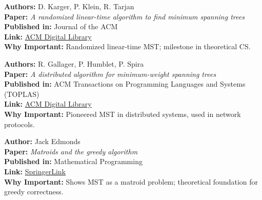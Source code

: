 \documentclass[a4paper,14pt]{extarticle}
\begin{document}
\begin{tcolorbox}[title=5. Karger’s Randomized MST (1995)]
\textbf{Authors:} D. Karger, P. Klein, R. Tarjan \\
\textbf{Paper:} \textit{A randomized linear-time algorithm to find minimum spanning trees} \\
\textbf{Published in:} Journal of the ACM \\
\textbf{Link:} \href{https://dl.acm.org/doi/10.1145/210332.210337}{ACM Digital Library} \\
\textbf{Why Important:} Randomized linear-time MST; milestone in theoretical CS.
\end{tcolorbox}

\begin{tcolorbox}[title=6. Distributed MST (1983)]
\textbf{Authors:} R. Gallager, P. Humblet, P. Spira \\
\textbf{Paper:} \textit{A distributed algorithm for minimum-weight spanning trees} \\
\textbf{Published in:} ACM Transactions on Programming Languages and Systems (TOPLAS) \\
\textbf{Link:} \href{https://dl.acm.org/doi/10.1145/357172.357176}{ACM Digital Library} \\
\textbf{Why Important:} Pioneered MST in distributed systems, used in network protocols.
\end{tcolorbox}

\begin{tcolorbox}[title=7. Matroid Theory and Greedy MST (1971)]
\textbf{Author:} Jack Edmonds \\
\textbf{Paper:} \textit{Matroids and the greedy algorithm} \\
\textbf{Published in:} Mathematical Programming \\
\textbf{Link:} \href{https://doi.org/10.1007/BF01585995}{SpringerLink} \\
\textbf{Why Important:} Shows MST as a matroid problem; theoretical foundation for greedy correctness.
\end{tcolorbox}

\newpage

\end{document}
